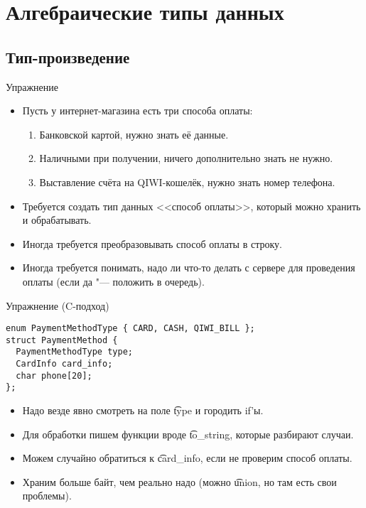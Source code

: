 \section{Алгебраические типы данных}
\subsection{Тип-произведение}

\begin{frame}
\end{frame}

\begin{frame}{Упражнение}
	\begin{itemize}
		\item Пусть у интернет-магазина есть три способа оплаты:
			\begin{enumerate}
				\item Банковской картой, нужно знать её данные.
				\item Наличными при получении, ничего дополнительно знать не нужно.
				\item Выставление счёта на QIWI-кошелёк, нужно знать номер телефона.
			\end{enumerate}
		\item Требуется создать тип данных <<способ оплаты>>, который можно хранить и обрабатывать.
		\item Иногда требуется преобразовывать способ оплаты в строку.
		\item Иногда требуется понимать, надо ли что-то делать с сервере для проведения оплаты (если да "--- положить в очередь).
	\end{itemize}
\end{frame}

\begin{frame}[fragile]{Упражнение (C-подход)}
\begin{verbatim}
enum PaymentMethodType { CARD, CASH, QIWI_BILL };
struct PaymentMethod {
  PaymentMethodType type;
  CardInfo card_info;
  char phone[20];
};
\end{verbatim}
	\begin{itemize}
		\item Надо везде явно смотреть на поле \t{type} и городить if'ы.
		\item Для обработки пишем функции вроде \t{to\_string}, которые разбирают случаи.
		\item Можем случайно обратиться к \t{card\_info}, если не проверим способ оплаты.
		\item Храним больше байт, чем реально надо (можно \t{union}, но там есть свои проблемы).
	\end{itemize}
\end{frame}

